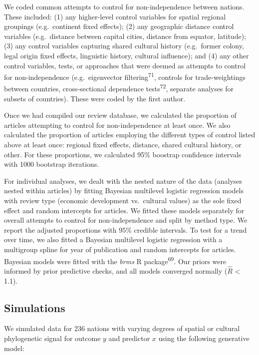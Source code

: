 \documentclass[english,man,floatsintext]{apa6}
\begin{document}
We coded common attempts to control for non-independence between nations. These included: (1) any higher-level control variables for spatial regional groupings (e.g.~continent fixed effects); (2) any geographic distance control variables (e.g.~distance between capital cities, distance from equator, latitude); (3) any control variables capturing shared cultural history (e.g.~former colony, legal origin fixed effects, linguistic history, cultural influence); and (4) any other control variables, tests, or approaches that were deemed as attempts to control for non-independence (e.g.~eigenvector filtering\textsuperscript{71}, controls for trade-weightings between countries, cross-sectional dependence tests\textsuperscript{72}, separate analyses for subsets of countries). These were coded by the first author.

Once we had compiled our review database, we calculated the proportion of articles attempting to control for non-independence at least once. We also calculated the proportion of articles employing the different types of control listed above at least once: regional fixed effects, distance, shared cultural history, or other. For these proportions, we calculated 95\% boostrap confidence intervals with 1000 bootstrap iterations.

For individual analyses, we dealt with the nested nature of the data (analyses nested within articles) by fitting Bayesian multilevel logistic regression models with review type (economic development vs.~cultural values) as the sole fixed effect and random intercepts for articles. We fitted these models separately for overall attempts to control for non-independence and split by method type. We report the adjusted proportions with 95\% credible intervals. To test for a trend over time, we also fitted a Bayesian multilevel logistic regression with a multigroup spline for year of publication and random intercepts for articles. Bayesian models were fitted with the \emph{brms} R package\textsuperscript{69}. Our priors were informed by prior predictive checks, and all models converged normally (\(\hat{R}\) \textless{} 1.1).

\hypertarget{simulations}{%
\subsection{Simulations}\label{simulations}}

We simulated data for 236 nations with varying degrees of spatial or cultural phylogenetic signal for outcome \(y\) and predictor \(x\) using the following generative model:
\end{document}
